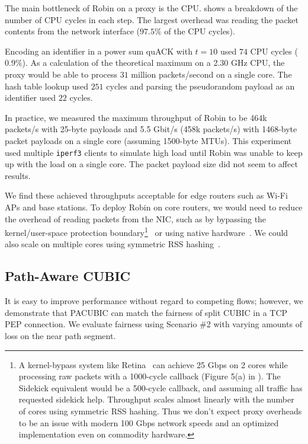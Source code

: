 The main bottleneck of Robin on a proxy is the CPU\@.
 shows a breakdown of the number of CPU cycles in each
step. The largest overhead was reading the packet contents from the network
interface ($97.5\%$ of the CPU cycles).

Encoding an identifier in a power sum quACK with $t=10$ used $74$ CPU
cycles ($0.9\%$). As a calculation of the theoretical maximum on a 2.30 GHz
CPU, the proxy would be able to process $31$ million packets/second on a single
core. The hash table lookup used $251$ cycles and parsing the pseudorandom
payload as an identifier used $22$ cycles.

In practice, we measured the maximum throughput of Robin to
be 464k packets/s with 25-byte payloads and 5.5 Gbit/s (458k packets/s) with
1468-byte packet payloads on a single core (assuming 1500-byte MTUs).
This experiment used multiple \texttt{iperf3} clients to simulate high
load until Robin was unable to keep up with the load on a single core.
The packet payload size did not seem to affect results.

We find these achieved throughputs acceptable for edge routers such as Wi-Fi
APs and base stations.
To deploy Robin on core routers, we would need to reduce the overhead of reading
packets from the NIC, such as by bypassing the kernel/user-space
protection boundary\footnote{
A kernel-bypass system like Retina~\cite{wan2022retina} can achieve
25 Gbps on 2 cores while processing raw packets with a 1000-cycle callback
(Figure 5(a) in \cite{wan2022retina}). The Sidekick equivalent would be a 500-cycle
callback, and assuming all traffic has requested sidekick help. Throughput scales
almost linearly with the number of cores using symmetric RSS hashing.
Thus we don't expect proxy overheads to be an issue with modern 100 Gbps network
speeds and an optimized implementation even on commodity hardware.
}~\cite{dpdk,mccanne1993bsd,wan2022retina}
or using native hardware~\cite{bosshart2014p4}.
We could also scale on multiple cores using symmetric RSS hashing~\cite{woo2012scalable}.

\subsection{Path-Aware CUBIC}



It is easy to improve performance without regard to competing flows;
however, we demonstrate that PACUBIC can
match the fairness of split CUBIC in a TCP PEP connection\@.
We evaluate fairness using Scenario \#2 with varying amounts of loss on the
near path segment.

